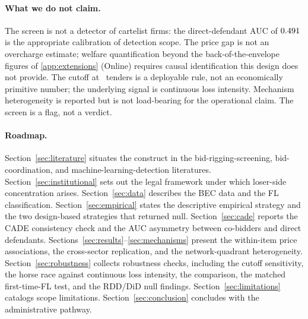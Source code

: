 \paragraph{What we do not claim.} The screen is not a
detector of cartelist firms: the direct-defendant AUC of
$0.491$ is the appropriate calibration of detection
scope. The price
gap is not an overcharge estimate; welfare quantification
beyond the back-of-the-envelope figures of
\ref{app:extensions} (Online) requires causal identification
this design does not provide. The cutoff at \valThreshold\ tenders
is a deployable rule, not an economically primitive number;
the underlying signal is continuous loss intensity. Mechanism
heterogeneity is reported but is not load-bearing for the
operational claim. The screen is a flag, not a verdict.

\paragraph{Roadmap.} Section~\ref{sec:literature} situates the
construct in the bid-rigging-screening, bid-coordination, and
machine-learning-detection literatures.
Section~\ref{sec:institutional} sets out the legal framework
under which loser-side concentration arises.
Section~\ref{sec:data} describes the BEC data and the FL
classification. Section~\ref{sec:empirical} states the
descriptive empirical strategy and the two design-based
strategies that returned null. Section~\ref{sec:cade} reports
the CADE consistency check and the AUC asymmetry between
co-bidders and direct defendants.
Sections~\ref{sec:results}--\ref{sec:mechanisms} present the
within-item price associations, the cross-sector replication,
and the network-quadrant heterogeneity.
Section~\ref{sec:robustness} collects robustness checks,
including the cutoff sensitivity, the horse race against
continuous loss intensity, the
\citeauthor{imhof2019detecting} comparison, the matched
first-time-FL test, and the RDD/DiD null findings.
Section~\ref{sec:limitations} catalogs scope limitations.
Section~\ref{sec:conclusion} concludes with the
administrative pathway.
